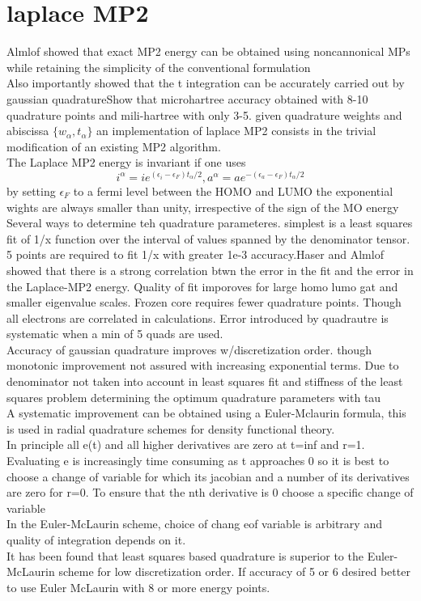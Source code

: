 \documentclass[10pt, draft]{article}
\begin{document}
\section{laplace MP2}
Almlof showed that exact MP2 energy can be obtained using noncannonical MPs while retaining the simplicity of the conventional formulation\\
Also importantly showed that the t integration can be accurately carried out by gaussian quadratureShow that microhartree accuracy obtained with 8-10 quadrature points and mili-hartree with only 3-5.  given quadrature weights and abiscissa $\{w_\alpha, t_\alpha\}$ an implementation of laplace MP2 consists in the trivial modification of an existing MP2 algorithm.\\
The Laplace MP2 energy is invariant if one uses 
\[i^\alpha = ie^{(\epsilon_i - \epsilon_F)t_\alpha/2} , a^\alpha = ae^{-(\epsilon_a - \epsilon_F)t_\alpha/2}\]
by setting $\epsilon_F$ to a fermi level between the HOMO and LUMO the exponential wights are always smaller than unity, irrespective of the sign of the MO energy\\
Several ways to determine teh quadrature parameteres. simplest is a least squares fit of 1/x function over the interval of values spanned by the denominator tensor.  5 points are required to fit 1/x with greater 1e-3 accuracy.Haser and Almlof showed that there is a strong correlation btwn the error in the fit and the error in the Laplace-MP2 energy.  Quality of fit imporoves for large homo lumo gat and smaller eigenvalue scales. Frozen core requires fewer quadrature points.  Though all electrons are correlated in calculations.  Error introduced by quadrautre is systematic when a min of 5 quads are used.  \\

Accuracy of gaussian quadrature improves w/discretization order.  though monotonic improvement not assured with increasing exponential terms. Due to denominator not taken into account in least squares fit and stiffness of the least squares problem determining the optimum quadrature parameters with tau\\
A systematic improvement can be obtained using a Euler-Mclaurin formula, this is used in radial quadrature schemes for density functional theory.\\
In principle all e(t) and all higher derivatives are zero at t=inf and r=1. Evaluating e is increasingly time consuming as t approaches 0 so it is best to choose a change of variable for which its jacobian and a number of its derivatives are zero for r=0.  To ensure that the nth derivative is 0 choose a specific change of variable\\
In the Euler-McLaurin scheme, choice of chang eof variable is arbitrary and quality of integration depends on it.  \\
It has been found that least squares based quadrature is superior to the Euler-McLaurin scheme for low discretization order.  If accuracy of 5 or 6 desired better to use Euler McLaurin with 8 or more energy points.
\end{document}
